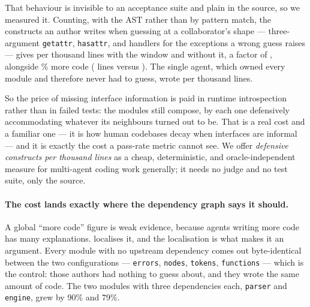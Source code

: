 \documentclass[10pt,twocolumn]{article}
\theoremstyle{definition}
\theoremstyle{plain}
\newcommand{\code}[1]{\texttt{\small #1}}
\begin{document}
That behaviour is invisible to an acceptance suite and plain in the source, so we
measured it. Counting, with the AST rather than by pattern match, the constructs an
author writes when guessing at a collaborator's shape --- three-argument
\code{getattr}, \code{hasattr}, and handlers for the exceptions a wrong guess raises
--- gives \NSwDefShared{} per thousand lines with the window and \NSwDefNoshared{}
without it, a factor of \NSwDefRatio, alongside \NSwLinesRatio\% more code
(\NSwLinesShared{} lines versus \NSwLinesNoshared). The single agent, which owned every
module and therefore never had to guess, wrote \NSwSoloDef{} per thousand lines.

So the price of missing interface information is paid in runtime introspection rather
than in failed tests: the modules still compose, by each one defensively
accommodating whatever its neighbours turned out to be. That is a real cost and a
familiar one --- it is how human codebases decay when interfaces are informal --- and it
is exactly the cost a pass-rate metric cannot see. We offer
\emph{defensive constructs per thousand lines} as a cheap, deterministic, and
oracle-independent measure for multi-agent coding work generally; it needs no judge and
no test suite, only the source.

\begin{table}[t]
\centering\scriptsize

\caption{Code size per module with and without published interfaces. The cost falls
exactly on the modules that \emph{consume} interfaces: every module with no upstream
dependency is byte-identical, while the two modules with three dependencies each nearly
double.}
\label{tab:growth}
\end{table}

\paragraph{The cost lands exactly where the dependency graph says it should.} A global
``more code'' figure is weak evidence, because agents writing more code has many
explanations.  localises it, and the localisation is what makes it an
argument. Every module with no upstream dependency comes out byte-identical between the
two configurations --- \code{errors}, \code{nodes}, \code{tokens}, \code{functions} ---
which is the control: those authors had nothing to guess about, and they wrote the same
amount of code. The two modules with three dependencies each, \code{parser} and
\code{engine}, grew by 90\% and 79\%.
\end{document}
